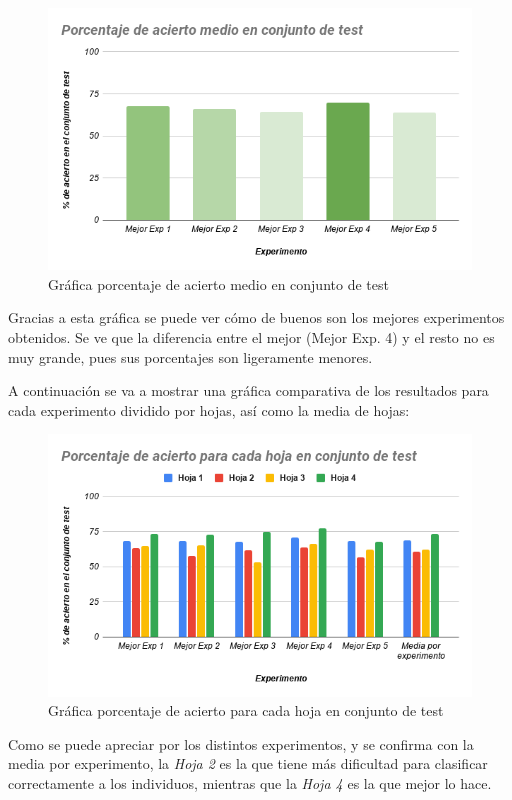 \documentclass{uc3mpracticas}
\begin{document}
\begin{figure}[!h]
\centering
  \includegraphics[width=.7\linewidth]{Images/p_acierto_medio_test.png}
  \caption*{Gráfica porcentaje de acierto medio en conjunto de test}
\end{figure}

Gracias a esta gráfica se puede ver cómo de buenos son los mejores experimentos obtenidos. Se ve que la diferencia entre el mejor (Mejor Exp. 4) y el resto no es muy grande, pues sus porcentajes son ligeramente menores.

\vspace{2mm}

A continuación se va a mostrar una gráfica comparativa de los resultados para cada experimento dividido por hojas, así como la media de hojas:

\newpage

\begin{figure}[!h]
\centering
  \includegraphics[width=.7\linewidth]{Images/p_acierto_cada_hoja_test.png}
  \caption*{Gráfica porcentaje de acierto para cada hoja en conjunto de test}
\end{figure}

Como se puede apreciar por los distintos experimentos, y se confirma con la media por experimento, la \textit{Hoja 2} es la que tiene más dificultad para clasificar correctamente a los individuos, mientras que la \textit{Hoja 4} es la que mejor lo hace.
\end{document}
